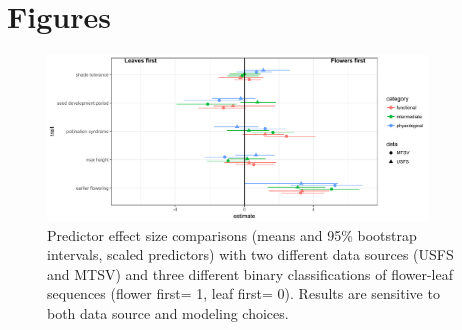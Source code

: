 \documentclass{article}\usepackage[]{graphicx}\usepackage[]{color}
\begin{document}

\pagebreak
\section*{Figures}
\begin{figure}[here]
\includegraphics[width=0.9\textwidth]{..//figures/MTSV_v_USFS_comp.pdf}
\caption{Predictor effect size comparisons (means and 95\% bootstrap intervals, scaled predictors) with two different data sources (USFS and MTSV) and three different binary classifications of flower-leaf sequences (flower first= 1, leaf first= 0). Results are sensitive to both data source and modeling choices.}
\label{fig:Figure 1}
\end{figure}
\end{document}
